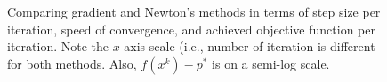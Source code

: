 \documentclass[12pt] {article}
\begin{document}
\begin{figure}[!tbh]
\centering        
   
   
   \caption{Comparing gradient and Newton's methods in terms of step size per iteration, speed of convergence, and achieved objective function per iteration. Note the $x$-axis scale (i.e., number of iteration is different for both methods. Also,  $f(x^{k})-p^{*}$  is on a semi-log scale.}
   \label{fig:comp}
\end{figure}
\end{document}
